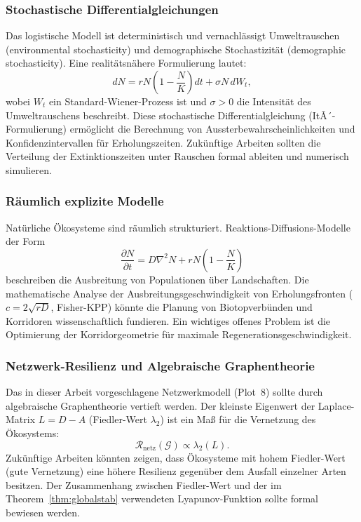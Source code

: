 ﻿\documentclass[a4paper,12pt]{article}
\theoremstyle{definition}
\begin{document}
\subsubsection{Stochastische Differentialgleichungen}

Das logistische Modell ist deterministisch und vernachlässigt Umweltrauschen (environmental stochasticity) und demographische Stochastizität (demographic stochasticity). Eine realitätsnähere Formulierung lautet:
\[
dN = r N\!\left(1 - \frac{N}{K}\right) dt + \sigma N\, dW_t,
\]
wobei $W_t$ ein Standard-Wiener-Prozess ist und $\sigma > 0$ die Intensität des Umweltrauschens beschreibt. Diese stochastische Differentialgleichung (ItÃ´-Formulierung) ermöglicht die Berechnung von Aussterbewahrscheinlichkeiten und Konfidenzintervallen für Erholungszeiten. Zukünftige Arbeiten sollten die Verteilung der Extinktionszeiten unter Rauschen formal ableiten und numerisch simulieren.

\subsubsection{Räumlich explizite Modelle}

Natürliche Ökosysteme sind räumlich strukturiert. Reaktions-Diffusions-Modelle der Form
\[
\frac{\partial N}{\partial t} = D \nabla^2 N + rN\!\left(1 - \frac{N}{K}\right)
\]
beschreiben die Ausbreitung von Populationen über Landschaften. Die mathematische Analyse der Ausbreitungsgeschwindigkeit von Erholungsfronten ($c = 2\sqrt{rD}$, Fisher-KPP) könnte die Planung von Biotopverbünden und Korridoren wissenschaftlich fundieren. Ein wichtiges offenes Problem ist die Optimierung der Korridorgeometrie für maximale Regenerationsgeschwindigkeit.

\subsubsection{Netzwerk-Resilienz und Algebraische Graphentheorie}

Das in dieser Arbeit vorgeschlagene Netzwerkmodell (Plot~8) sollte durch algebraische Graphentheorie vertieft werden. Der kleinste Eigenwert der Laplace-Matrix $L = D - A$ (Fiedler-Wert $\lambda_2$) ist ein Maß für die Vernetzung des Ökosystems:
\[
\mathcal{R}_{\text{netz}}(\mathcal{G}) \propto \lambda_2(L).
\]
Zukünftige Arbeiten könnten zeigen, dass Ökosysteme mit hohem Fiedler-Wert (gute Vernetzung) eine höhere Resilienz gegenüber dem Ausfall einzelner Arten besitzen. Der Zusammenhang zwischen Fiedler-Wert und der im Theorem~\ref{thm:globalstab} verwendeten Lyapunov-Funktion sollte formal bewiesen werden.
\end{document}
